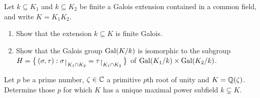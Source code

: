 \begin{problem}
  Let \(k\subseteq K_1\) and \(k\subseteq K_2\) be finite a Galois extension
  contained in a common field, and write \(K=K_1K_2\).
  \begin{enumerate}[label=(\alph*)]
  \item Show that the extension \(k\subseteq K\) is finite Galois.
  \item Show that the Galois group \(\operatorname{Gal}(K/k)\) is isomorphic to the
    subgroup
    \(H=\bigl\{\,(\sigma,\tau):\sigma\restrict{K_1\cap
      K_2}=\tau\restrict{K_1\cap K_2}\,\bigr\}\) of
    \(\operatorname{Gal}(K_1/k)\times\operatorname{Gal}(K_2/k)\).
  \end{enumerate}
\end{problem}
\begin{solution}
\end{solution}

\begin{problem}
  Let \(p\) be a prime number, \(\zeta\in\mathbb{C}\) a primitive \(p\)th root of
  unity and \(K=\mathbb{Q}(\zeta)\). Determine those \(p\) for which \(K\) has a
  unique maximal power subfield \(k\subsetneq K\).
\end{problem}
\begin{solution}
\end{solution}

